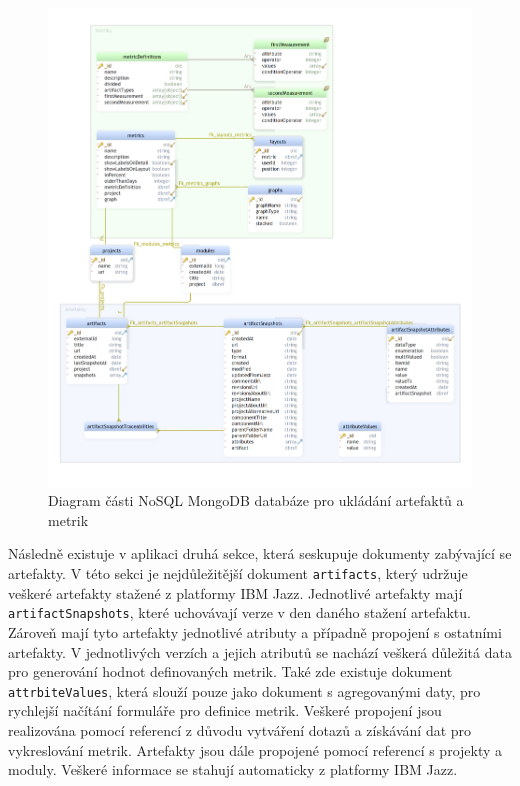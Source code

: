 \documentclass[czech,master]{diploma}
\begin{document}
\begin{figure}[!ht]
    \centering
    \includegraphics[width=1\textwidth]{Diplomka/Figures/db_diagram.png}
    \caption{Diagram části NoSQL MongoDB databáze pro ukládání artefaktů a metrik}
    \label{fig:mongo_diagram}
\end{figure}
Následně existuje v aplikaci druhá sekce, která seskupuje dokumenty zabývající se artefakty. V této sekci je nejdůležitější dokument \texttt{artifacts}, který udržuje veškeré artefakty stažené z platformy IBM Jazz. Jednotlivé artefakty mají \texttt{artifactSnapshots}, které uchovávají verze v den daného stažení artefaktu. Zároveň mají tyto artefakty jednotlivé atributy a případně propojení s ostatními artefakty. V jednotlivých verzích a jejich atributů se nachází veškerá důležitá data pro generování hodnot definovaných metrik. Také zde existuje dokument \texttt{attrbiteValues}, která slouží pouze jako dokument s agregovanými daty, pro rychlejší načítání formuláře pro definice metrik. Veškeré propojení jsou realizována pomocí referencí z důvodu vytváření dotazů a získávání dat pro vykreslování metrik. Artefakty jsou dále propojené pomocí referencí s projekty a moduly. Veškeré informace se stahují automaticky z platformy IBM Jazz.
\end{document}

